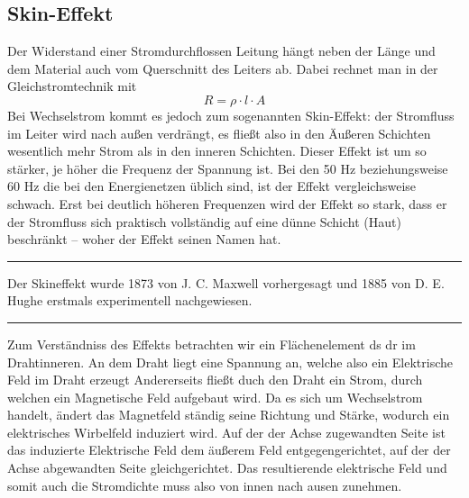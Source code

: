
\subsection{Skin-Effekt}
Der Widerstand einer Stromdurchflossen Leitung hängt neben der Länge und dem Material auch vom Querschnitt des Leiters ab. Dabei rechnet man in der Gleichstromtechnik mit
\begin{equation}
R = \rho \cdot l \cdot A
\end{equation}
Bei Wechselstrom kommt es jedoch zum sogenannten Skin-Effekt: der Stromfluss im Leiter wird nach außen verdrängt, es fließt also in den Äußeren Schichten wesentlich mehr Strom als in den inneren Schichten. Dieser Effekt ist um so stärker, je höher die Frequenz der Spannung ist. Bei den 50 Hz beziehungsweise 60 Hz die bei den Energienetzen üblich sind, ist der Effekt vergleichsweise schwach. Erst bei deutlich höheren Frequenzen wird der Effekt so stark, dass er der Stromfluss sich praktisch vollständig auf eine dünne Schicht (Haut) beschränkt -- woher der Effekt seinen Namen hat.

\bigskip \hrule \bigskip

Der Skineffekt wurde 1873 von J. C. Maxwell vorhergesagt und 1885 von D. E. Hughe erstmals experimentell nachgewiesen\cite{BergmannSchaefer}.

\bigskip \hrule \bigskip

Zum Verständniss des Effekts betrachten wir ein Flächenelement ds dr im Drahtinneren.
An dem Draht liegt eine Spannung an, welche also ein Elektrische Feld im Draht erzeugt
Andererseits fließt duch den Draht ein Strom, durch welchen ein Magnetische Feld aufgebaut wird.
Da es sich um Wechselstrom handelt, ändert das Magnetfeld ständig seine Richtung und Stärke, wodurch ein elektrisches Wirbelfeld induziert wird.
Auf der der Achse zugewandten Seite ist das induzierte Elektrische Feld dem äußerem Feld entgegengerichtet, auf der der Achse abgewandten Seite gleichgerichtet.
Das resultierende elektrische Feld und somit auch die Stromdichte muss also von innen nach ausen zunehmen.

